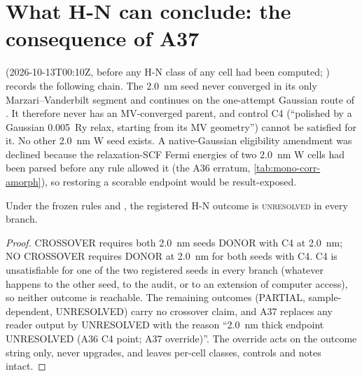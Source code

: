 \section{What H-N can conclude: the consequence of A37}
\label{sec:mono-am-a37}

 (2026-10-13T00:10Z, before any H-N class of any cell had been computed; ) records the following
chain. The 2.0~nm seed  never converged in its only Marzari--Vanderbilt segment and continues on the
one-attempt Gaussian route of . It therefore never has an MV-converged parent, and control C4 (``polished by a
Gaussian 0.005~Ry relax, starting from its MV geometry'') cannot be satisfied for it. No other 2.0~nm W seed exists. A
native-Gaussian eligibility amendment was declined because the relaxation-SCF Fermi energies of two 2.0~nm W cells had
been parsed before any rule allowed it (the A36 erratum, \cref{tab:mono-corr-amorph}), so restoring a scorable endpoint
would be result-exposed.

\begin{proposition}
\label{prop:mono-hn}
Under the frozen rules and , the registered H-N outcome is \textsc{unresolved} in every branch.
\end{proposition}
\begin{proof}
CROSSOVER requires both 2.0~nm seeds DONOR with C4 at 2.0~nm; NO CROSSOVER requires DONOR at 2.0~nm for both seeds with
C4. C4 is unsatisfiable for one of the two registered seeds in every branch (whatever happens to the other seed, to
the audit, or to an extension of computer access), so neither outcome is reachable. The remaining outcomes (PARTIAL,
sample-dependent, UNRESOLVED) carry no crossover claim, and A37 replaces any reader output by UNRESOLVED with the reason
``2.0~nm thick endpoint UNRESOLVED (A36 C4 point; A37 override)''. The override acts on the outcome string only, never
upgrades, and leaves per-cell classes, controls and notes intact. \qedhere
\end{proof}

